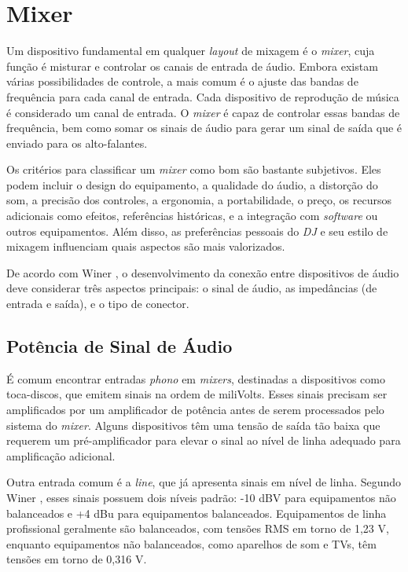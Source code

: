 \section{Mixer}

Um dispositivo fundamental em qualquer \textit{layout} de mixagem é o \textit{mixer}, cuja função é misturar e controlar os canais de entrada de áudio. Embora existam várias possibilidades de controle, a mais comum é o ajuste das bandas de frequência para cada canal de entrada. Cada dispositivo de reprodução de música é considerado um canal de entrada. O \textit{mixer} é capaz de controlar essas bandas de frequência, bem como somar os sinais de áudio para gerar um sinal de saída que é enviado para os alto-falantes.

Os critérios para classificar um \textit{mixer} como bom são bastante subjetivos. Eles podem incluir o design do equipamento, a qualidade do áudio, a distorção do som, a precisão dos controles, a ergonomia, a portabilidade, o preço, os recursos adicionais como efeitos, referências históricas, e a integração com \textit{software} ou outros equipamentos. Além disso, as preferências pessoais do \textit{DJ} e seu estilo de mixagem influenciam quais aspectos são mais valorizados.

De acordo com Winer \cite{winer}, o desenvolvimento da conexão entre dispositivos de áudio deve considerar três aspectos principais: o sinal de áudio, as impedâncias (de entrada e saída), e o tipo de conector.

\subsection{Potência de Sinal de Áudio}

É comum encontrar entradas \textit{phono} em \textit{mixers}, destinadas a dispositivos como toca-discos, que emitem sinais na ordem de miliVolts. Esses sinais precisam ser amplificados por um amplificador de potência antes de serem processados pelo sistema do \textit{mixer}. Alguns dispositivos têm uma tensão de saída tão baixa que requerem um pré-amplificador para elevar o sinal ao nível de linha adequado para amplificação adicional.

Outra entrada comum é a \textit{line}, que já apresenta sinais em nível de linha. Segundo Winer \cite{winer}, esses sinais possuem dois níveis padrão: -10 dBV para equipamentos não balanceados e +4 dBu para equipamentos balanceados. Equipamentos de linha profissional geralmente são balanceados, com tensões RMS em torno de 1,23 V, enquanto equipamentos não balanceados, como aparelhos de som e TVs, têm tensões em torno de 0,316 V.

